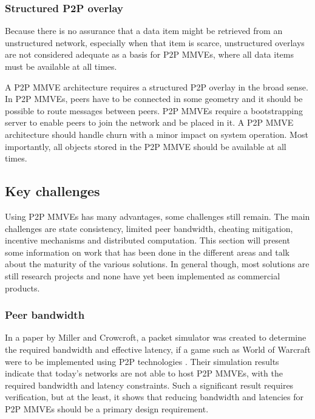 \subsubsection{Structured P2P overlay}

Because there is no assurance that a data item might be retrieved from an unstructured network, especially when that item is scarce, unstructured overlays are not considered adequate as a basis for P2P MMVEs, where all data items must be available at all times.

A P2P MMVE architecture requires a structured P2P overlay in the broad sense. In P2P MMVEs, peers have to be connected in some geometry and it should be possible to route messages between peers. P2P MMVEs require a bootstrapping server to enable peers to join the network and be placed in it. A P2P MMVE architecture should handle churn with a minor impact on system operation. Most importantly, all objects stored in the P2P MMVE should be available at all times.

\subsection{Key challenges}
\label{key_challenges}

Using P2P MMVEs has many advantages, some challenges still remain. The main challenges are state consistency, limited peer bandwidth, cheating mitigation, incentive mechanisms and distributed computation. This section will present some information on work that has been done in the different areas and talk about the maturity of the various solutions. In general though, most solutions are still research projects and none have yet been implemented as commercial products.

\subsubsection{Peer bandwidth}
\label{peer_bandwidth_usage}

In a paper by Miller and Crowcroft, a packet simulator was created to determine the required bandwidth and effective latency, if a game such as World of Warcraft were to be implemented using P2P technologies \cite{Miller_p2p_infeasability}. Their simulation results indicate that today's networks are not able to host P2P MMVEs, with the required bandwidth and latency constraints. Such a significant result requires verification, but at the least, it shows that reducing bandwidth and latencies for P2P MMVEs should be a primary design requirement.

